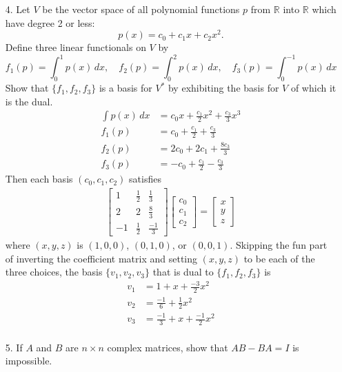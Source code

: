 \documentclass{article}
\begin{document}
\begin{enumerate}[listparindent=\parindent]
\item[4.] Let \(V\) be the vector space of all polynomial functions \(p\) from \(\mathbb{R}\) into \(\mathbb{R}\)
    which have degree 2 or less: \[ p(x) = c_0 + c_1x + c_2x^2. \]
    Define three linear functionals on \(V\) by
    \[ f_1(p) = \int_0^1 p(x)\, dx,\quad f_2(p) = \int_0^2 p(x)\, dx,\quad f_3(p) = \int_0^{-1} p(x)\, dx \]
    Show that \(\{f_1, f_2, f_3\}\) is a basis for \(V^*\) by exhibiting the basis for \(V\) of which it is the dual.
    \begin{align*}
        \int p(x)\, dx &= c_0x + \frac{c_1}{2}x^2 + \frac{c_3}{3}x^3 \\
        f_1(p) &= c_0 + \frac{c_1}{2} + \frac{c_3}{3} \\
        f_2(p) &= 2c_0 + 2c_1 + \frac{8c_3}{3} \\
        f_3(p) &= -c_0 + \frac{c_1}{2} - \frac{c_3}{3}
    \end{align*}
    Then each basis \((c_0, c_1, c_2)\) satisfies
    \begin{gather*}
        \begin{bmatrix}
            1 & \frac{1}{2} & \frac{1}{3} \\
            2 & 2 & \frac{8}{3} \\
            -1 & \frac{1}{2} & \frac{-1}{3}
        \end{bmatrix}
        \begin{bmatrix} c_0 \\ c_1 \\ c_2 \end{bmatrix} =
        \begin{bmatrix} x \\ y \\ z \end{bmatrix}
    \end{gather*}
    where \((x, y, z)\) is \((1, 0, 0)\), \((0, 1, 0)\), or \((0, 0, 1)\).
    Skipping the fun part of inverting the coefficient matrix and setting \((x, y, z)\) to be each of the three choices,
    the basis \(\{v_1, v_2, v_3\}\) that is dual to \(\{f_1, f_2, f_3\}\) is
    \begin{align*}
        v_1 &= 1 + x + \frac{-3}{2}x^2 \\
        v_2 &= \frac{-1}{6} +  \frac{1}{2}x^2 \\
        v_3 &= \frac{-1}{3} + x + \frac{-1}{2}x^2 \\
    \end{align*}

\item[5.] If \(A\) and \(B\) are \(n \times n\) complex matrices, show that \(AB - BA = I\) is impossible.


\end{enumerate}
\end{document}
